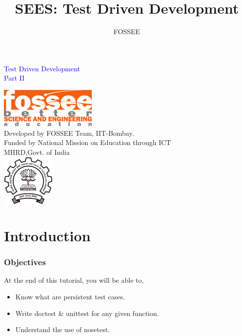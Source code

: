 \documentclass[12pt,presentation]{beamer}
\title{SEES: Test Driven Development}
\author{FOSSEE}
\begin{document}
\begin{frame}
\begin{center}
\vspace{12pt}
\textcolor{blue}{\huge Test Driven Development \\Part II}
\end{center}
\vspace{18pt}
\begin{center}
\vspace{10pt}
\includegraphics[scale=0.95]{../images/fossee-logo.png}\\
\vspace{5pt}
\scriptsize Developed by FOSSEE Team, IIT-Bombay. \\ 
\scriptsize Funded by National Mission on Education through ICT\\
\scriptsize  MHRD,Govt. of India\\
\includegraphics[scale=0.30]{../images/iitb-logo.png}\\
\end{center}
\end{frame}
\section{Introduction}

\begin{frame}
  \frametitle{Objectives}
  At the end of this tutorial, you will be able to,
  \begin{itemize}
  \item Know what are persistent test cases.
  \item Write doctest \& unittest for any given function.
  \item Understand the use of nosetest.
 
  \end{itemize}
  \end{frame}
\end{document}
